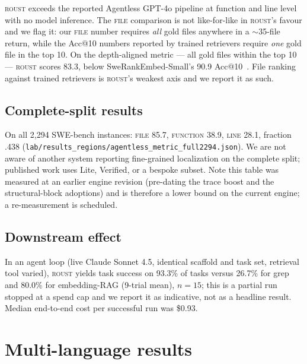 \documentclass[11pt]{article}
\begin{document}
\textsc{roust} exceeds the reported Agentless GPT-4o pipeline at function and
line level with no model inference. The \textsc{file} comparison is not
like-for-like in \textsc{roust}'s favour and we flag it: our \textsc{file}
number requires \emph{all} gold files anywhere in a $\sim$35-file return,
while the Acc@10 numbers reported by trained retrievers require \emph{one}
gold file in the top 10. On the depth-aligned metric --- all gold files within
the top 10 --- \textsc{roust} scores 83.3, below SweRankEmbed-Small's 90.9
Acc@10~\cite{swerank}. File ranking against trained retrievers is
\textsc{roust}'s weakest axis and we report it as such.

\subsection{Complete-split results}
On all 2{,}294 SWE-bench instances: \textsc{file} 85.7, \textsc{function}
38.9, \textsc{line} 28.1, fraction .438 (\texttt{lab/results\_regions/agentless\_metric\_full2294.json}).
We are not aware of another system reporting fine-grained localization on the
complete split; published work uses Lite, Verified, or a bespoke subset. Note
this table was measured at an earlier engine revision (pre-dating the trace
boost and the structural-block adoptions) and is therefore a lower bound on
the current engine; a re-measurement is scheduled.

\subsection{Downstream effect}
In an agent loop (live Claude Sonnet 4.5, identical scaffold and task set,
retrieval tool varied), \textsc{roust} yields task success on 93.3\% of tasks
versus 26.7\% for grep and 80.0\% for embedding-RAG (9-trial mean), $n = 15$;
this is a partial run stopped at a spend cap and we report it as indicative,
not as a headline result. Median end-to-end cost per successful run was
\$0.93.

\section{Multi-language results}
\label{sec:multilang}
\end{document}

